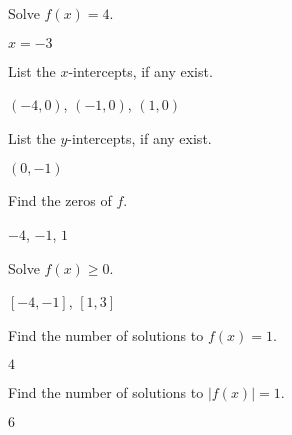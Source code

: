 \documentclass{ximera}
\begin{document}
\begin{question}
Solve $f(x) = 4$.

\begin{solution}
$x=-3$
\end{solution}

\end{question}

\begin{question}
List the $x$-intercepts, if any exist.
\begin{solution}
$(-4,0)$, $(-1,0)$, $(1,0)$
\end{solution}

\end{question}

\begin{question}
List the $y$-intercepts, if any exist.

\begin{solution}
$(0,-1)$

\end{solution}

\end{question}

\begin{question}
Find the zeros of $f$.
\begin{solution}
$-4$, $-1$, $1$
\end{solution}

\end{question}

\begin{question}
Solve $f(x) \geq 0$.

\begin{solution}
$[-4,-1]$, $[1,3]$
\end{solution}

\end{question}

\begin{question}
Find the number of solutions to $f(x) = 1$.
\begin{solution}
$4$

\end{solution}

\end{question}

\begin{question}
Find the number of solutions to $|f(x)| = 1$.

\begin{solution}
$6$
\end{solution}

\end{question}
\end{document}

